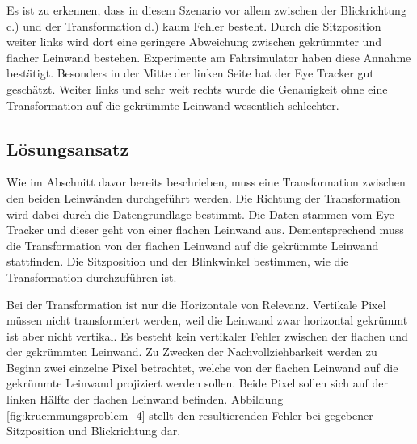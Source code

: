 Es ist zu erkennen, dass in diesem Szenario vor allem zwischen der Blickrichtung c.) und der Transformation d.) kaum Fehler besteht. Durch die Sitzposition weiter links wird dort eine geringere Abweichung zwischen gekrümmter und flacher Leinwand bestehen. Experimente am Fahrsimulator haben diese Annahme bestätigt. Besonders in der Mitte der linken Seite hat der Eye Tracker gut geschätzt. Weiter links und sehr weit rechts wurde die Genauigkeit ohne eine Transformation auf die gekrümmte Leinwand wesentlich schlechter. 



\subsection{Lösungsansatz}

Wie im Abschnitt davor bereits beschrieben, muss eine Transformation zwischen den beiden Leinwänden durchgeführt werden. Die Richtung der Transformation wird dabei durch die Datengrundlage bestimmt. Die Daten stammen vom Eye Tracker und dieser geht von einer flachen Leinwand aus. Dementsprechend muss die Transformation von der flachen Leinwand auf die gekrümmte Leinwand stattfinden. 
Die Sitzposition und der Blinkwinkel bestimmen, wie die Transformation durchzuführen ist. 

Bei der Transformation ist nur die Horizontale von Relevanz. Vertikale Pixel müssen nicht transformiert werden, weil die Leinwand zwar horizontal gekrümmt ist aber nicht vertikal. Es besteht kein vertikaler Fehler zwischen der flachen und der gekrümmten Leinwand. Zu Zwecken der Nachvollziehbarkeit werden zu Beginn zwei einzelne Pixel betrachtet, welche von der flachen Leinwand auf die gekrümmte Leinwand projiziert werden sollen. Beide Pixel sollen sich auf der linken Hälfte der flachen Leinwand befinden. Abbildung \ref{fig:kruemmungsproblem_4} stellt den resultierenden Fehler bei gegebener Sitzposition und Blickrichtung dar. 



